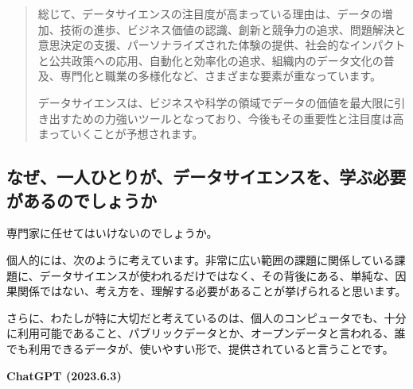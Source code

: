 \documentclass[
  xelatex, ja=standard]{bxjsbook}
\theoremstyle{definition}
\theoremstyle{definition}
\theoremstyle{definition}
\theoremstyle{definition}
\theoremstyle{remark}
\begin{document}
\begin{quote}
総じて、データサイエンスの注目度が高まっている理由は、データの増加、技術の進歩、ビジネス価値の認識、創新と競争力の追求、問題解決と意思決定の支援、パーソナライズされた体験の提供、社会的なインパクトと公共政策への応用、自動化と効率化の追求、組織内のデータ文化の普及、専門化と職業の多様化など、さまざまな要素が重なっています。

データサイエンスは、ビジネスや科学の領域でデータの価値を最大限に引き出すための力強いツールとなっており、今後もその重要性と注目度は高まっていくことが予想されます。
\end{quote}

\hypertarget{ux306aux305cux4e00ux4ebaux3072ux3068ux308aux304cux30c7ux30fcux30bfux30b5ux30a4ux30a8ux30f3ux30b9ux3092ux5b66ux3076ux5fc5ux8981ux304cux3042ux308bux306eux3067ux3057ux3087ux3046ux304b}{%
\subsection{なぜ、一人ひとりが、データサイエンスを、学ぶ必要があるのでしょうか}\label{ux306aux305cux4e00ux4ebaux3072ux3068ux308aux304cux30c7ux30fcux30bfux30b5ux30a4ux30a8ux30f3ux30b9ux3092ux5b66ux3076ux5fc5ux8981ux304cux3042ux308bux306eux3067ux3057ux3087ux3046ux304b}}

専門家に任せてはいけないのでしょうか。

個人的には、次のように考えています。非常に広い範囲の課題に関係している課題に、データサイエンスが使われるだけではなく、その背後にある、単純な、因果関係ではない、考え方を、理解する必要があることが挙げられると思います。

さらに、わたしが特に大切だと考えているのは、個人のコンピュータでも、十分に利用可能であること、パブリックデータとか、オープンデータと言われる、誰でも利用できるデータが、使いやすい形で、提供されていると言うことです。

\textbf{ChatGPT (2023.6.3)}
\end{document}
